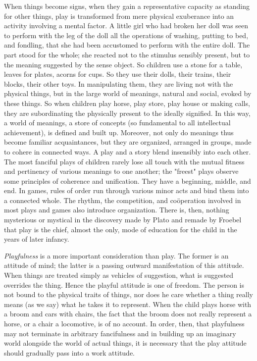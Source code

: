 \documentclass[letterpaper]{book}
\begin{document}

When things become signs, when they gain a representative capacity as
standing for other things, play is transformed from mere physical
exuberance into an activity involving a mental factor. A little girl who
had broken her doll was seen to perform with the leg of the doll all the
operations of washing, putting to bed, and fondling, that she had been
accustomed to perform with the entire doll. The part stood for the
whole; she reacted not to the stimulus sensibly present, but to the
meaning suggested by the sense object. So children use a stone for a
table, leaves for plates, acorns for cups. So they use their dolls,
their trains, their blocks, their other toys. In manipulating them, they
are living not with the physical things, but in the large world of
meanings, natural and social, evoked by these things. So when children
play horse, play store, play house or making calls, they are
subordinating the physically present to the ideally signified. In this
way, a world of meanings, a store of concepts (so fundamental to all
intellectual achievement), is defined and built
up.
Moreover, not only do meanings thus become familiar acquaintances, but
they are organized, arranged in groups, made to cohere in connected
ways. A play and a story blend insensibly into each other. The most
fanciful plays of children rarely lose all touch with the mutual fitness
and pertinency of various meanings to one another; the "freest" plays
observe some principles of coherence and unification. They have a
beginning, middle, and end. In games, rules of order run through various
minor acts and bind them into a connected whole. The rhythm, the
competition, and coöperation involved in most plays and games also
introduce organization. There is, then, nothing mysterious or mystical
in the discovery made by Plato and remade by Froebel that play is the
chief, almost the only, mode of education for the child in the years of
later infancy.


\emph{Playfulness} is a more important consideration than play. The
former is an attitude of mind; the latter is a passing outward
manifestation of this attitude. When things are treated simply as
vehicles of suggestion, what is suggested overrides the thing. Hence the
playful attitude is one of freedom. The person is not bound to the
physical traits of things, nor does he care whether a thing really means
(as we say) what he takes it to represent. When the child plays horse
with a broom and cars with chairs, the fact that the broom does not
really represent a horse, or a chair a locomotive, is of no account. In
order, then, that playfulness may not terminate in arbitrary
fancifulness and in building up an imaginary world alongside the world
of actual things, it is necessary that the play attitude should
gradually pass into a work attitude.
\end{document}
